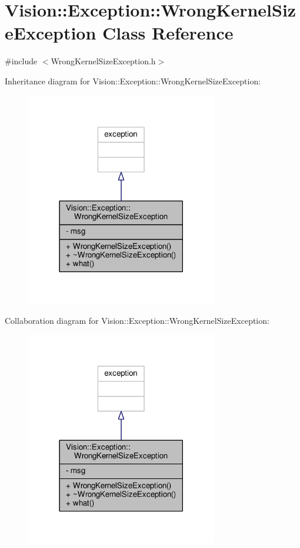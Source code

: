 \hypertarget{class_vision_1_1_exception_1_1_wrong_kernel_size_exception}{}\section{Vision\+:\+:Exception\+:\+:Wrong\+Kernel\+Size\+Exception Class Reference}
\label{class_vision_1_1_exception_1_1_wrong_kernel_size_exception}


{\ttfamily \#include $<$Wrong\+Kernel\+Size\+Exception.\+h$>$}



Inheritance diagram for Vision\+:\+:Exception\+:\+:Wrong\+Kernel\+Size\+Exception\+:\nopagebreak
\begin{figure}[H]
\begin{center}
\leavevmode
\includegraphics[width=237pt]{class_vision_1_1_exception_1_1_wrong_kernel_size_exception__inherit__graph}
\end{center}
\end{figure}


Collaboration diagram for Vision\+:\+:Exception\+:\+:Wrong\+Kernel\+Size\+Exception\+:\nopagebreak
\begin{figure}[H]
\begin{center}
\leavevmode
\includegraphics[width=237pt]{class_vision_1_1_exception_1_1_wrong_kernel_size_exception__coll__graph}
\end{center}
\end{figure}
